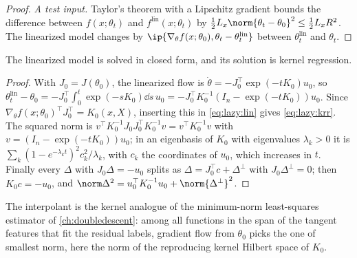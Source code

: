 \begin{refsection}
\begin{proof}
\emph{A test input.} Taylor's theorem with a Lipschitz gradient bounds the difference between $f(x;\theta_t)$ and $f^{\mathrm{lin}}(x;\theta_t)$ by $\frac12L_x\norm{\theta_t-\theta_0}^2\le\frac12L_xR^2$. The linearized model changes by $\ip{\nabla_\theta f(x;\theta_0),\theta_t-\theta^{\mathrm{lin}}_t}$ between $\theta^{\mathrm{lin}}_t$ and $\theta_t$.
\end{proof}

The linearized model is solved in closed form, and its solution is kernel regression.


\begin{proof}
With $J_0=J(\theta_0)$, the linearized flow is $\dot\theta=-J_0^\top\exp(-tK_0)u_0$, so $\theta^{\mathrm{lin}}_t-\theta_0=-J_0^\top\int_0^t\exp(-sK_0)\dd s\,u_0=-J_0^\top K_0^{-1}(I_n-\exp(-tK_0))u_0$. Since $\nabla_\theta f(x;\theta_0)^\top J_0^\top=K_0(x,X)$, inserting this in \eqref{eq:lazy:lin} gives \eqref{eq:lazy:krr}. The squared norm is $v^\top K_0^{-1}J_0J_0^\top K_0^{-1}v=v^\top K_0^{-1}v$ with $v=(I_n-\exp(-tK_0))u_0$; in an eigenbasis of $K_0$ with eigenvalues $\lambda_k>0$ it is $\sum_k(1-e^{-\lambda_kt})^2c_k^2/\lambda_k$, with $c_k$ the coordinates of $u_0$, which increases in $t$. Finally every $\Delta$ with $J_0\Delta=-u_0$ splits as $\Delta=J_0^\top c+\Delta^\perp$ with $J_0\Delta^\perp=0$; then $K_0c=-u_0$, and $\norm\Delta^2=u_0^\top K_0^{-1}u_0+\norm{\Delta^\perp}^2$.
\end{proof}

The interpolant is the kernel analogue of the minimum-norm least-squares estimator of \cref{ch:doubledescent}: among all functions in the span of the tangent features that fit the residual labels, gradient flow from $\theta_0$ picks the one of smallest norm, here the norm of the reproducing kernel Hilbert space of $K_0$.


\end{refsection}
